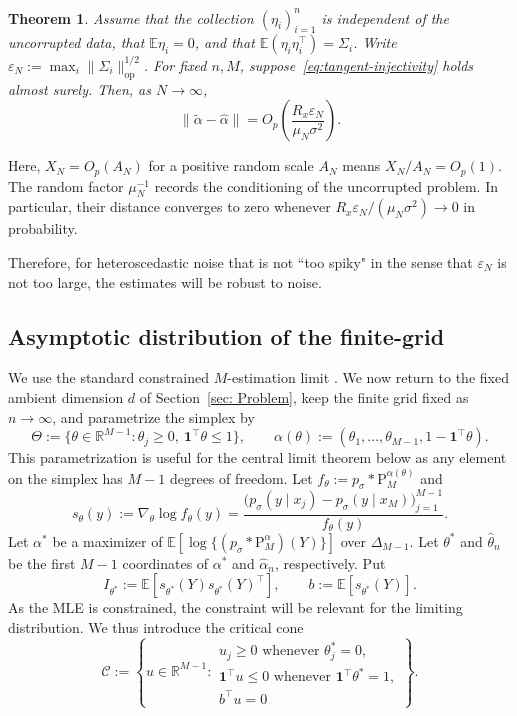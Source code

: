 \documentclass[12pt]{iopart}
\newtheorem{thm}{Theorem}
\theoremstyle{remark}
\begin{document}
\begin{thm}
\label{thm: NoiseMisspecification}
Assume that the collection $(\eta_i)_{i=1}^n$ is independent of the
uncorrupted data, that $\mathbb E\eta_i=0$, and that
$\mathbb E(\eta_i\eta_i^\top)=\Sigma_i$. Write
$\varepsilon_N:=\max_i\|\Sigma_i\|_{\mathrm{op}}^{1/2}$.
For fixed $n,M$, suppose~\eqref{eq:tangent-injectivity} holds almost surely.
Then, as $N\to\infty$,
\begin{equation}
\label{eq:misspecified-noise-argmax}
\|\widetilde\alpha-\widehat\alpha\|
=O_p\!\left(\frac{R_x\varepsilon_N}{\mu_N\sigma^2}\right).
\end{equation}
\end{thm}

Here, $X_N=O_p(A_N)$ for a positive random scale $A_N$ means
$X_N/A_N=O_p(1)$.
The random factor $\mu_N^{-1}$ records the conditioning of the uncorrupted
problem. In particular, their distance converges to zero whenever
$R_x\varepsilon_N/(\mu_N\sigma^2)\to0$ in probability. 

Therefore, for heteroscedastic noise that is not ``too spiky" in the sense that $\varepsilon_N$ is not too large, the estimates will be robust to noise. 



\medskip
\subsection{Asymptotic distribution of the finite-grid}
We use the standard constrained $M$-estimation limit
\citep{geyer1994constrained}. We now return to the fixed ambient dimension
$d$ of Section~\ref{sec: Problem}, keep the finite grid fixed as
$n\to\infty$, and parametrize the simplex by
\[
\Theta:=\{\theta\in\mathbb R^{M-1}:\theta_j\geq0,\
\mathbf1^\top\theta\leq1\},
\qquad
\alpha(\theta):=(\theta_1,\ldots,\theta_{M-1},
1-\mathbf1^\top\theta).
\]
This parametrization is useful for the central limit theorem below as any element on the simplex has $M-1$ degrees of freedom.
Let $f_\theta:=p_\sigma*\mathrm P_M^{\alpha(\theta)}$ and
\[
s_\theta(y):=\nabla_\theta\log f_\theta(y)
=\frac{\bigl(p_\sigma(y\mid x_j)-p_\sigma(y\mid x_M)\bigr)_{j=1}^{M-1}}
{f_\theta(y)}.
\]
Let $\alpha^*$ be a maximizer of
$\mathbb E[\log\{(p_\sigma*\mathrm P_M^\alpha)(Y)\}]$ over
$\Delta_{M-1}$.
Let $\theta^*$ and $\hat\theta_n$ be the first $M-1$ coordinates of
$\alpha^*$ and $\hat\alpha_n$, respectively. Put
\[
I_{\theta^*}:=
\mathbb E[s_{\theta^*}(Y)s_{\theta^*}(Y)^\top],
\qquad
b:=\mathbb E[s_{\theta^*}(Y)].
\]
As the MLE is constrained, the constraint will be relevant for the limiting distribution. We thus introduce the critical cone 
\[
\mathcal C:=\left\{u\in\mathbb R^{M-1}:
\begin{array}{l}
u_j\geq0\text{ whenever }\theta_j^*=0,\\
\mathbf1^\top u\leq0\text{ whenever }\mathbf1^\top\theta^*=1,\\
b^\top u=0
\end{array}
\right\}.
\]
\end{document}
